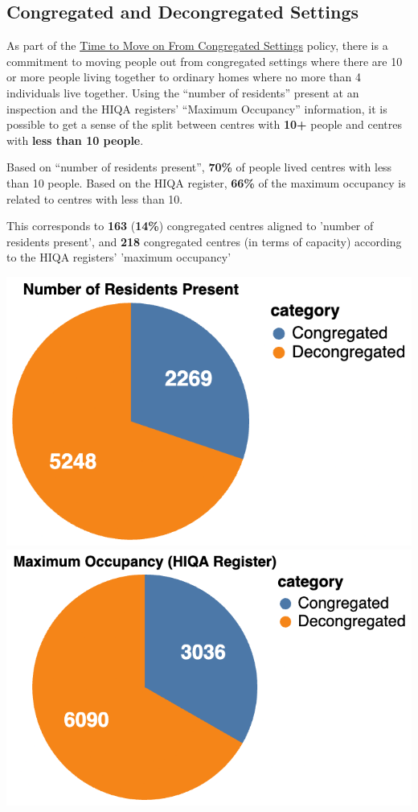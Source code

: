 \documentclass[a4paper,11pt,twoside]{article}
\begin{document}
\subsection{Congregated and Decongregated Settings}
\label{sec:orga62c0b8}

As part of the \href{https://www.hse.ie/eng/services/list/4/disability/congregatedsettings/timetomoveon.html\#:\~:text=Time\%20to\%20Move\%20on\%20from\%20Congregated\%20Settings\%20\%E2\%80\%93,people\%20to\%20\%E2\%80\%98live\%20ordinary\%20lives\%20in\%20ordinary\%20places\%E2\%80\%99.}{Time to Move on From Congregated Settings} policy, there is a commitment to moving people out from congregated settings where there are 10 or more people living together to ordinary homes where no more than 4 individuals live together. Using the ``number of residents'' present at an inspection and the HIQA registers' ``Maximum Occupancy'' information, it is possible to get a sense of the split between centres with \textbf{10+} people and centres with \textbf{less than 10 people}.

Based on ``number of residents present'', \textbf{70\%} of people lived centres with less than 10 people. Based on the HIQA register, \textbf{66\%} of the maximum occupancy is related to centres with less than 10.

This corresponds to \textbf{163} (\textbf{14\%}) congregated centres aligned to 'number of residents present', and \textbf{218} congregated centres (in terms of capacity) according to the HIQA registers' 'maximum occupancy'

\begin{center}
\includegraphics[height=0.3\textwidth]{img/05_num_residents_congregated.png}
\includegraphics[height=0.3\textwidth]{img/06_max_occ_congregated.png}
\end{center}
\end{document}
